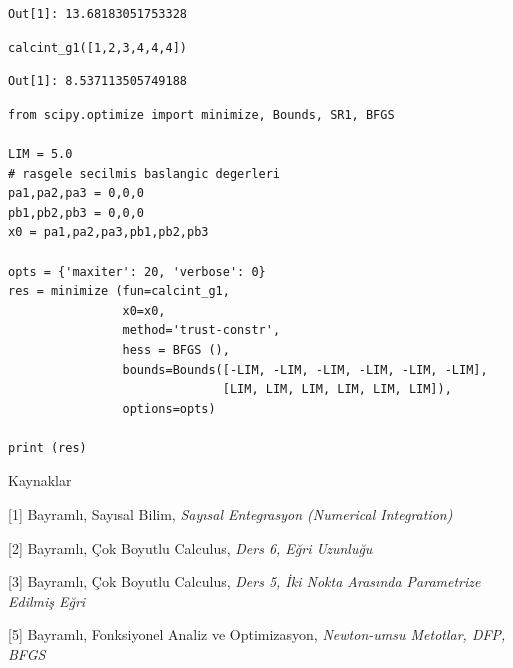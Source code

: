 \documentclass[12pt,fleqn]{article}\usepackage{../../common}
\begin{document}
\begin{verbatim}
Out[1]: 13.68183051753328
\end{verbatim}

\begin{verbatim}
calcint_g1([1,2,3,4,4,4])
\end{verbatim}

\begin{verbatim}
Out[1]: 8.537113505749188
\end{verbatim}

\begin{verbatim}
from scipy.optimize import minimize, Bounds, SR1, BFGS

LIM = 5.0
# rasgele secilmis baslangic degerleri
pa1,pa2,pa3 = 0,0,0
pb1,pb2,pb3 = 0,0,0
x0 = pa1,pa2,pa3,pb1,pb2,pb3

opts = {'maxiter': 20, 'verbose': 0}
res = minimize (fun=calcint_g1,
                x0=x0,
                method='trust-constr',
                hess = BFGS (),
                bounds=Bounds([-LIM, -LIM, -LIM, -LIM, -LIM, -LIM],
                              [LIM, LIM, LIM, LIM, LIM, LIM]),
                options=opts)

print (res)
\end{verbatim}





Kaynaklar 

[1] Bayramlı, Sayısal Bilim, {\em Sayısal Entegrasyon (Numerical Integration)}

[2] Bayramlı, Çok Boyutlu Calculus, {\em Ders 6, Eğri Uzunluğu}

[3] Bayramlı, Çok Boyutlu Calculus, {\em Ders 5, İki Nokta Arasında Parametrize Edilmiş Eğri}

[5] Bayramlı, Fonksiyonel Analiz ve Optimizasyon, {\em Newton-umsu Metotlar, DFP, BFGS }
\end{document}
